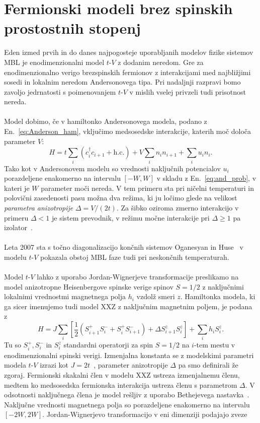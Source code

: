 \section{Fermionski modeli brez spinskih prostostnih stopenj}
\label{Heis_spinless}
Eden izmed prvih in do danes najpogosteje uporabljanih modelov fizike sistemov MBL je enodimenzionalni model $t$-$V$ z dodanim neredom. Gre za enodimenzionalno verigo brezspinskih fermionov z interakcijami med najbližjimi sosedi in lokalnim neredom Andersonovega tipa. Pri nadaljnji razpravi bomo zavoljo jedrnatosti s poimenovanjem $t$-$V$ v mislih vselej privzeli tudi prisotnost nereda. \\\\Model dobimo, če v hamiltonko Andersonovega modela, podano z En.~\eqref{eq:Anderson_ham}, vključimo medsosedske interakcije, katerih moč določa parameter $V$:
\begin{equation}\label{eq:tV}
H=t\sum\limits_i\left(c^\dagger_i c_{i+1} + \mathrm{h.c.}\right) + V\sum\limits_i n_in_{i+1} + \sum\limits_i u_in_i.
\end{equation} 
Tako kot v Andersonovem modelu so vrednosti naključnih potencialov $u_i$ porazdeljene enakomerno na intervalu $[-W,W]$ v skladu z En.~\eqref{eq:and_prob}, v kateri je $W$ parameter moči nereda. V tem primeru sta pri ničelni temperaturi in polovični zasedenosti pasu možna  dva režima, ki ju ločimo glede na velikost \emph{parametra anizotropije } $\Delta=V/(2t)$.  Za šibko oziroma zmerno interakcijo v primeru $\Delta<1$ je sistem prevodnik, v režimu močne interakcije pri $\Delta\geq 1$ pa izolator~\cite{prelovvsek2017density}. \\\\
Leta 2007 sta s točno diagonalizacijo končnih sistemov Oganesyan in Huse~\cite{PhysRevB.75.155111} v modelu $t$-$V$  pokazala obstoj MBL faze tudi pri neskončnih temperaturah. \\\\
Model $t$-$V$ lahko z uporabo Jordan-Wignerjeve transformacije preslikamo na model anizotropne Heisenbergove spinske verige spinov $S=1/2$  z naključnimi lokalnimi vrednostmi magnetnega polja $h_i$ vzdolž smeri $z$. Hamiltonka modela, ki ga sicer imenujemo tudi model XXZ z naključnim magnetnim poljem, je podana z 
\begin{equation}\label{eq:XXZ}
H=J\sum\limits_i\left[\frac{1}{2}\left(S_{i+1}^+S_i^- + S_i^+S_{i+1}^-\right) + \Delta S_{i+1}^zS_i^z\right] + \sum\limits_i h_i S_i^z.
\end{equation}
Tu so $S_i^+, S_i^-$ in $S_i^z$ standardni operatorji za spin $S=1/2$ na $i$-tem mestu v enodimenzionalni spinski verigi. Izmenjalna konstanta se z modelskimi parametri modela $t$-$V$ izrazi kot $J=2t$~\cite{prelovvsek2017density}, parameter anizotropije $\Delta$ pa smo definirali že zgoraj. Fermionski skakalni člen v modelu XXZ ustreza izmenjalnemu členu, medtem ko medsosedska fermionska interakcija ustreza členu s parametrom $\Delta$. V odsotnosti naključnega člena je model rešljiv z uporabo Bethejevega nastavka~\cite{karabach1997introduction}. Naključne vrednosti magnetnega polja so porazdeljene enakomerno na intervalu $[-2W,2W]$.  Jordan-Wignerjevo transformacijo v eni dimenziji podajajo zveze
